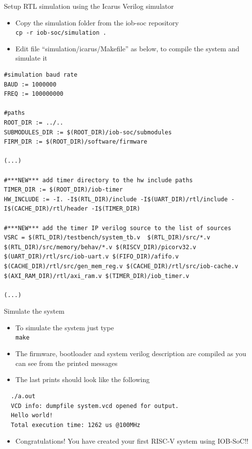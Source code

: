 \documentclass [xcolor=svgnames, t] {beamer}
\begin{document}
\begin{frame}[fragile]{Setup RTL simulation using the Icarus Verilog simulator}

\begin{itemize}
\item Copy the simulation folder from the iob-soc repository\\ {\tt cp -r
  iob-soc/simulation .}
\item Edit file ``simulation/icarus/Makefile'' as below, to compile the system
  and simulate it
\end{itemize}

\begin{tiny}
\begin{lstlisting}
#simulation baud rate
BAUD := 1000000
FREQ := 100000000

#paths
ROOT_DIR := ../..
SUBMODULES_DIR := $(ROOT_DIR)/iob-soc/submodules
FIRM_DIR := $(ROOT_DIR)/software/firmware

(...)

#***NEW*** add timer directory to the hw include paths
TIMER_DIR := $(ROOT_DIR)/iob-timer
HW_INCLUDE := -I. -I$(RTL_DIR)/include -I$(UART_DIR)/rtl/include -I$(CACHE_DIR)/rtl/header -I$(TIMER_DIR)

#***NEW*** add the timer IP verilog source to the list of sources
VSRC = $(RTL_DIR)/testbench/system_tb.v  $(RTL_DIR)/src/*.v $(RTL_DIR)/src/memory/behav/*.v $(RISCV_DIR)/picorv32.v $(UART_DIR)/rtl/src/iob-uart.v $(FIFO_DIR)/afifo.v $(CACHE_DIR)/rtl/src/gen_mem_reg.v $(CACHE_DIR)/rtl/src/iob-cache.v $(AXI_RAM_DIR)/rtl/axi_ram.v $(TIMER_DIR)/iob_timer.v

(...)
\end{lstlisting}
\end{tiny}
\end{frame}

\begin{frame}[fragile]{Simulate the system}

\begin{itemize}
\item To simulate the system just type\\
  {\tt make} 
\item The firmware, bootloader and system verilog description are compiled as you can see from the printed messages
\item The last prints should look like the following
\end{itemize}

\begin{tiny}
\begin{lstlisting}
  ./a.out
  VCD info: dumpfile system.vcd opened for output.
  Hello world!
  Total execution time: 1262 us @100MHz
\end{lstlisting}
\end{tiny}

\begin{itemize}
\item Congratulations! You have created your first RISC-V system using IOB-SoC!!\\
\end{itemize}

\end{frame}
\end{document}
